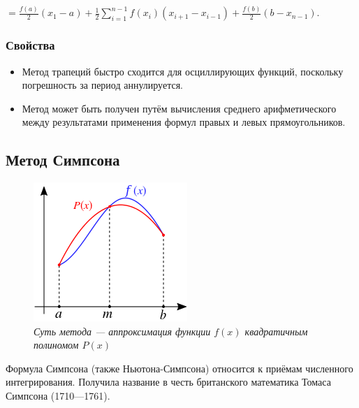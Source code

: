 \documentclass[a4paper]{article}
\begin{document}
{{{{{{{{\begin{center}
{{\(= \frac{f(a)}{2}(x_{1} - a) + \frac{1}{2}\sum\limits_{i = 1}^{n - 1}{f(x_{i})}(x_{i + 1} - x_{i - 1}) + \frac{f(b)}{2}(b - x_{n - 1}).\)}}
\end{center}

\subsubsection{Свойства}

\begin{itemize}
\item
  Метод трапеций быстро сходится для осциллирующих функций, поскольку
  погрешность за период аннулируется.
\item
  Метод может быть получен путём вычисления среднего арифметического
  между результатами применения формул правых и левых прямоугольников.
\end{itemize}

\newpage
\subsection{Метод Симпсона}

\begin{figure}
\includegraphics[width=0.9\linewidth]{images/simpson.png}
\caption{\textit{Суть метода — аппроксимация функции $f(x)$ квадратичным полиномом $P(x)$}}
\label{fig:wrapfig}
\end{figure}

Формула Симпсона (также Ньютона-Симпсона) относится к приёмам численного интегрирования. Получила название в честь британского математика Томаса Симпсона (1710—1761).

}}}}}}}}
\end{document}
